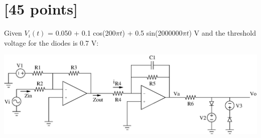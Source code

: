 \documentclass[12pt]{article}
\begin{document}


\clearpage



%
%
%
%
%
%
%
%
%
%
%
%
\section{[45 points]}

Given $V_i(t)$ = 0.050 + 0.1 cos(200$\pi t$) + 0.5 sin(2000000$\pi t$) V and the
threshold voltage for the diodes is 0.7 V:

\begin{center}
\includegraphics[width=1.0\linewidth]{sum_filt_comp.eps}
\end{center}
\end{document}
